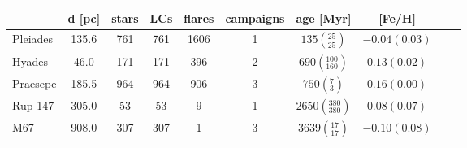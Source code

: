 \begin{tabular}{lccccccccr}
\hline
          &  d [pc] &  stars &  LCs &  flares &  campaigns &                        age [Myr] &         [Fe/H] \\
\hline
 Pleiades &   135.6 &    761 &  761 &    1606 &          1 &     $135\left(_{25}^{25}\right)$ &  $-0.04(0.03)$ \\
   Hyades &    46.0 &    171 &  171 &     396 &          2 &   $690\left(_{160}^{100}\right)$ &   $0.13(0.02)$ \\
 Praesepe &   185.5 &    964 &  964 &     906 &          3 &       $750\left(_{3}^{7}\right)$ &   $0.16(0.00)$ \\
  Rup 147 &   305.0 &     53 &   53 &       9 &          1 &  $2650\left(_{380}^{380}\right)$ &   $0.08(0.07)$ \\
      M67 &   908.0 &    307 &  307 &       1 &          3 &    $3639\left(_{17}^{17}\right)$ &  $-0.10(0.08)$ \\
\hline

\end{tabular}

